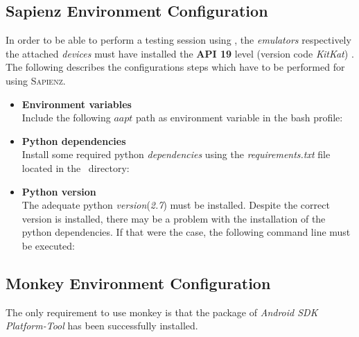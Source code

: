 \subsection{Sapienz Environment Configuration}
In order to be able to perform a testing session using \sapienz, the \textit{emulators} respectively the attached \textit{devices} must have installed the \textbf{API 19} level (version code \textit{KitKat}) \cite{api19}. 
The following describes the configurations steps which have to be performed for using \textsc{Sapienz}. 
\begin{itemize}
\item\textbf{Environment variables} \\ 
Include the following $aapt$ path as environment variable in the bash profile:
\begin{center}
\end{center}
\clearpage
\item \textbf{Python dependencies} \\
Install some required python \textit{dependencies} using the \textit{requirements.txt} file located in the \sapienz\ directory: 
\begin{center}
\end{center}

\item\textbf{Python version} \\
The adequate python \textit{version}(\textit{2.7}) must be installed. 
Despite the correct version is installed, there may be a problem with the installation of the python dependencies. 
If that were the case, the following command line must be executed:  
\begin{center}
\end{center}
\end{itemize}
\subsection{Monkey Environment Configuration}
The only requirement to use monkey is that the package of \textit{Android SDK Platform-Tool} has been successfully installed.


